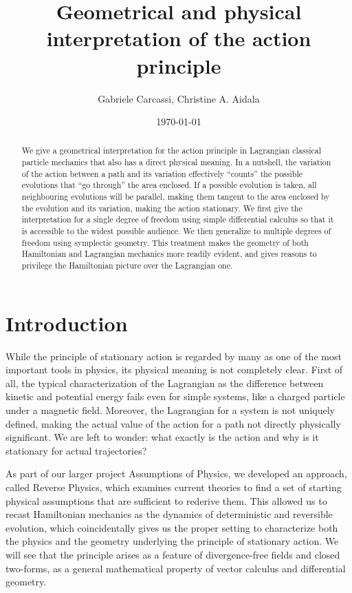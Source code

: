 \documentclass[10pt,twocolumn, nofootinbib]{revtex4-2}
\begin{document}
\title{Geometrical and physical interpretation of the action principle}
\author{Gabriele Carcassi, Christine A. Aidala}

\date{\today}


\begin{abstract}
We give a geometrical interpretation for the action principle in Lagrangian classical particle mechanics that also has a direct physical meaning. In a nutshell, the variation of the action between a path and its variation effectively ``counts'' the possible evolutions that ``go through'' the area enclosed. If a possible evolution is taken, all neighbouring evolutions will be parallel, making them tangent to the area enclosed by the evolution and its variation, making the action stationary. We first give the interpretation for a single degree of freedom using simple differential calculus so that it is accessible to the widest possible audience. We then generalize to multiple degrees of freedom using symplectic geometry. This treatment makes the geometry of both Hamiltonian and Lagrangian mechanics more readily evident, and gives reasons to privilege the Hamiltonian picture over the Lagrangian one.
\end{abstract}

\maketitle

\section{Introduction}

While the principle of stationary action is regarded by many as one of the most important tools in physics, its physical meaning is not completely clear. First of all, the typical characterization of the Lagrangian as the difference between kinetic and potential energy fails even for simple systems, like a charged particle under a magnetic field. Moreover, the Lagrangian for a system is not uniquely defined, making the actual value of the action for a path not directly physically significant.  We are left to wonder: what exactly is the action and why is it stationary for actual trajectories?

As part of our larger project Assumptions of Physics, we developed an approach, called Reverse Physics, which examines current theories to find a set of starting physical assumptions that are sufficient to rederive them. This allowed us to recast Hamiltonian mechanics as the dynamics of deterministic and reversible evolution, which coincidentally gives us the proper setting to characterize both the physics and the geometry underlying the principle of stationary action. We will see that the principle arises as a feature of divergence-free fields and closed two-forms, as a general mathematical property of vector calculus and differential geometry\cite{souriau1997structure}.
\end{document}
